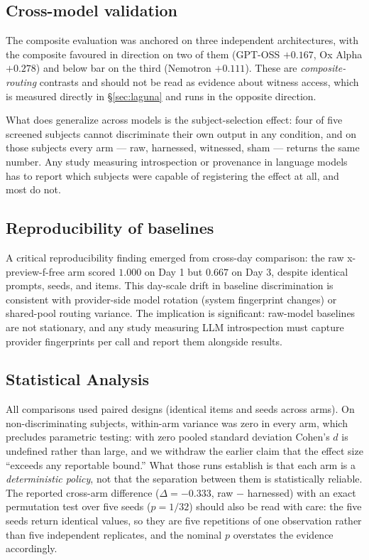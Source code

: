 \documentclass[11pt]{article}
\begin{document}
\subsection{Cross-model validation}

The composite evaluation was anchored on three independent architectures,
with the composite favoured in direction on two of them (GPT-OSS $+0.167$,
Ox Alpha $+0.278$) and below bar on the third (Nemotron $+0.111$). These
are \emph{composite-routing} contrasts and should not be read as evidence
about witness access, which is measured directly in \S\ref{sec:laguna} and
runs in the opposite direction.

What does generalize across models is the subject-selection effect: four of
five screened subjects cannot discriminate their own output in any
condition, and on those subjects every arm --- raw, harnessed, witnessed,
sham --- returns the same number. Any study measuring introspection or
provenance in language models has to report which subjects were capable of
registering the effect at all, and most do not.

\subsection{Reproducibility of baselines}

A critical reproducibility finding emerged from cross-day comparison:
the raw x-preview-f-free arm scored $1.000$ on Day 1 but $0.667$ on
Day 3, despite identical prompts, seeds, and items. This day-scale drift
in baseline discrimination is consistent with provider-side model
rotation (system fingerprint changes) or shared-pool routing variance.
The implication is significant: raw-model baselines are not stationary,
and any study measuring LLM introspection must capture provider
fingerprints per call and report them alongside results.

\subsection{Statistical Analysis}

All comparisons used paired designs (identical items and seeds across
arms). On non-discriminating subjects, within-arm variance was zero in
every arm, which precludes parametric testing: with zero pooled standard
deviation Cohen's $d$ is undefined rather than large, and we withdraw the
earlier claim that the effect size ``exceeds any reportable bound.'' What
those runs establish is that each arm is a \emph{deterministic policy}, not
that the separation between them is statistically reliable. The reported
cross-arm difference ($\Delta = -0.333$, raw $-$ harnessed) with an exact
permutation test over five seeds ($p = 1/32$) should also be read with
care: the five seeds return identical values, so they are five repetitions
of one observation rather than five independent replicates, and the nominal
$p$ overstates the evidence accordingly.
\end{document}
